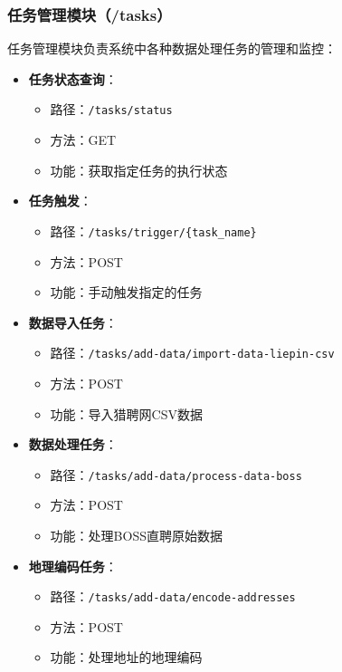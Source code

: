 \subsubsection{任务管理模块（/tasks）}
任务管理模块负责系统中各种数据处理任务的管理和监控：

\begin{itemize}
    \item \textbf{任务状态查询}：
    \begin{itemize}
        \item 路径：\texttt{/tasks/status}
        \item 方法：GET
        \item 功能：获取指定任务的执行状态
    \end{itemize}
    
    \item \textbf{任务触发}：
    \begin{itemize}
        \item 路径：\texttt{/tasks/trigger/\{task\_name\}}
        \item 方法：POST
        \item 功能：手动触发指定的任务
    \end{itemize}
    
    \item \textbf{数据导入任务}：
    \begin{itemize}
        \item 路径：\texttt{/tasks/add-data/import-data-liepin-csv}
        \item 方法：POST
        \item 功能：导入猎聘网CSV数据
    \end{itemize}
    
    \item \textbf{数据处理任务}：
    \begin{itemize}
        \item 路径：\texttt{/tasks/add-data/process-data-boss}
        \item 方法：POST
        \item 功能：处理BOSS直聘原始数据
    \end{itemize}
    
    \item \textbf{地理编码任务}：
    \begin{itemize}
        \item 路径：\texttt{/tasks/add-data/encode-addresses}
        \item 方法：POST
        \item 功能：处理地址的地理编码
    \end{itemize}
\end{itemize}

